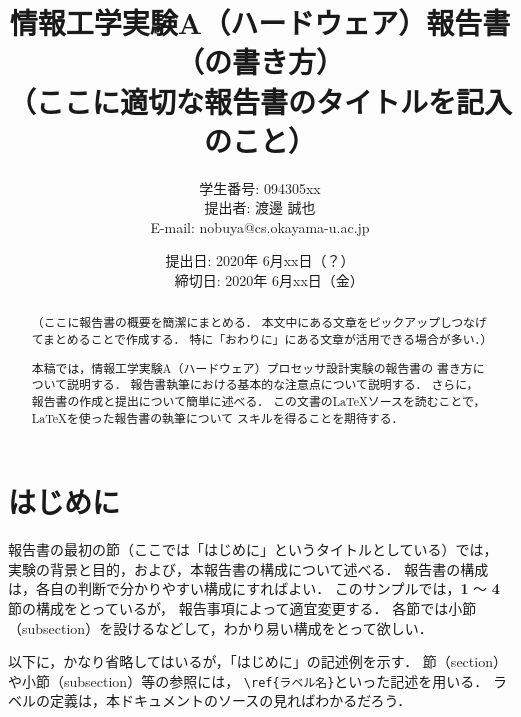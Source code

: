 \documentclass{jarticle}[11pt]
\title{{\normalsize 情報工学実験A（ハードウェア）報告書（の書き方）}\\
（ここに適切な報告書のタイトルを記入のこと）
}
\author{ 
  学生番号: 094305xx \\
  提出者: 渡邊 誠也 \\
  E-mail: nobuya@cs.okayama-u.ac.jp
}
\date{
  提出日: 2020年 6月xx日（？） \\　%
  締切日: 2020年 6月xx日（金）     %
}
\begin{document}
\maketitle


\begin{abstract}
（ここに報告書の概要を簡潔にまとめる．
本文中にある文章をピックアップしつなげてまとめることで作成する．
特に「おわりに」にある文章が活用できる場合が多い．）

本稿では，情報工学実験A（ハードウェア）プロセッサ設計実験の報告書の
書き方について説明する．
報告書執筆における基本的な注意点について説明する．
さらに，報告書の作成と提出について簡単に述べる．
この文書の\LaTeX ソースを読むことで，\LaTeX を使った報告書の執筆について
スキルを得ることを期待する．
\end{abstract}


\section{はじめに}

報告書の最初の節（ここでは「{\gt はじめに}」というタイトルとしている）では，
実験の背景と目的，および，本報告書の構成について述べる．
報告書の構成は，各自の判断で分かりやすい構成にすればよい．
このサンプルでは，{\bf 1} 〜 {\bf 4} 節の構成をとっているが，
報告事項によって適宜変更する．
各節では小節（subsection）を設けるなどして，わかり易い構成をとって欲しい．

以下に，かなり省略してはいるが，「{\gt はじめに}」の記述例を示す．
節（section）や小節（subsection）等の参照には，
\verb|\ref{ラベル名}|といった記述を用いる．
ラベルの定義は，本ドキュメントのソースの見ればわかるだろう．
\end{document}
